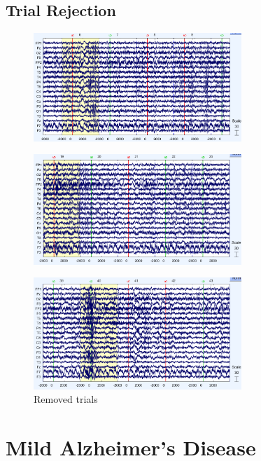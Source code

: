 \documentclass[hidelinks,12pt]{article}
\begin{document}
	
	\newpage
	
	\subsection{Trial Rejection}
	
	\begin{figure}[h!]
		\centering
		\includegraphics[width=0.7\textwidth]{34}
	\end{figure}
	
	\begin{figure}[h!]
		\centering
		\includegraphics[width=0.7\textwidth]{35}
	\end{figure}
	
	\begin{figure}[h!]
		\centering
		\includegraphics[width=0.7\textwidth]{36}
		\caption{Removed trials}
	\end{figure}
	
	\newpage
	
	
	\section{Mild Alzheimer's Disease}
\end{document}
